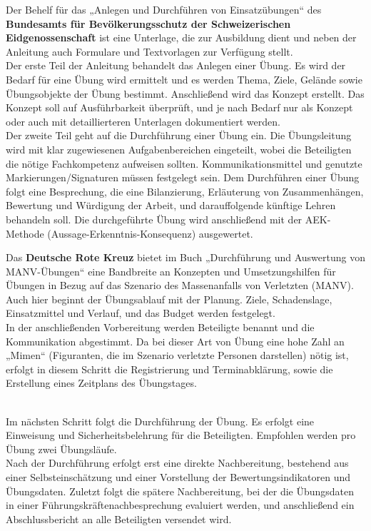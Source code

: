 Der Behelf für das „Anlegen und Durchführen von Einsatzübungen“ des \textbf{Bundesamts für Bevölkerungsschutz der Schweizerischen Eidgenossenschaft} \autocite{Behelf_Einsatzübungen} ist eine Unterlage, die zur Ausbildung dient und neben der Anleitung auch Formulare und Textvorlagen zur Verfügung stellt. \\
Der erste Teil der Anleitung behandelt das Anlegen einer Übung. Es wird der Bedarf für eine Übung wird ermittelt und es werden Thema, Ziele, Gelände sowie Übungsobjekte der Übung bestimmt. Anschließend wird das Konzept erstellt. Das Konzept soll auf Ausführbarkeit überprüft, und je nach Bedarf nur als Konzept oder auch mit detaillierteren Unterlagen dokumentiert werden. \\
Der zweite Teil geht auf die Durchführung einer Übung ein. Die Übungsleitung wird mit klar zugewiesenen Aufgabenbereichen eingeteilt, wobei die Beteiligten die nötige Fachkompetenz aufweisen sollten. Kommunikationsmittel und genutzte Markierungen/Signaturen müssen festgelegt sein. Dem Durchführen einer Übung folgt eine Besprechung, die eine Bilanzierung, Erläuterung von Zusammenhängen, Bewertung und Würdigung der Arbeit, und darauffolgende künftige Lehren behandeln soll. Die durchgeführte Übung wird anschließend mit der AEK-Methode (Aussage-Erkenntnis-Konsequenz) ausgewertet. \ 


Das \textbf{Deutsche Rote Kreuz} bietet im Buch „Durchführung und Auswertung von MANV-Übungen“ \autocite{MANV-Übungen} eine Bandbreite an Konzepten und Umsetzungshilfen für Übungen in Bezug auf das Szenario des Massenanfalls von Verletzten (MANV).
Auch hier beginnt der Übungsablauf mit der Planung. Ziele, Schadenslage, Einsatzmittel und Verlauf, und das Budget werden festgelegt. \\
In der anschließenden Vorbereitung werden Beteiligte benannt und die Kommunikation abgestimmt. Da bei dieser Art von Übung eine hohe Zahl an „Mimen“ (Figuranten, die im Szenario verletzte Personen darstellen) nötig ist, erfolgt in diesem Schritt die Registrierung und Terminabklärung, sowie die Erstellung eines Zeitplans des Übungstages. \\

\ 

Im nächsten Schritt folgt die Durchführung der Übung. Es erfolgt eine Einweisung und Sicherheitsbelehrung für die Beteiligten. Empfohlen werden pro Übung zwei Übungsläufe. \\
Nach der Durchführung erfolgt erst eine direkte Nachbereitung, bestehend aus einer Selbsteinschätzung und einer Vorstellung der Bewertungsindikatoren und Übungsdaten. Zuletzt folgt die spätere Nachbereitung, bei der die Übungsdaten in einer Führungskräftenachbesprechung evaluiert werden, und anschließend ein Abschlussbericht an alle Beteiligten versendet wird. \\

